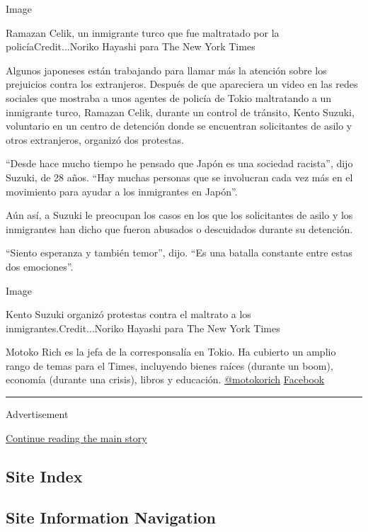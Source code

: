 Image

Ramazan Celik, un inmigrante turco que fue maltratado por la
policíaCredit...Noriko Hayashi para The New York Times

Algunos japoneses están trabajando para llamar más la atención sobre los
prejuicios contra los extranjeros. Después de que apareciera un video en
las redes sociales que mostraba a unos agentes de policía de Tokio
maltratando a un inmigrante turco, Ramazan Celik, durante un control de
tránsito, Kento Suzuki, voluntario en un centro de detención donde se
encuentran solicitantes de asilo y otros extranjeros, organizó dos
protestas.

``Desde hace mucho tiempo he pensado que Japón es una sociedad
racista'', dijo Suzuki, de 28 años. ``Hay muchas personas que se
involucran cada vez más en el movimiento para ayudar a los inmigrantes
en Japón''.

Aún así, a Suzuki le preocupan los casos en los que los solicitantes de
asilo y los inmigrantes han dicho que fueron abusados o descuidados
durante su detención.

``Siento esperanza y también temor'', dijo. ``Es una batalla constante
entre estas dos emociones''.

Image

Kento Suzuki organizó protestas contra el maltrato a los
inmigrantes.Credit...Noriko Hayashi para The New York Times

Motoko Rich es la jefa de la corresponsalía en Tokio. Ha cubierto un
amplio rango de temas para el Times, incluyendo bienes raíces (durante
un boom), economía (durante una crisis), libros y educación.
\href{https://twitter.com/motokorich}{@motokorich} \textbar{}
\href{https://www.facebookcorewwwi.onion/motoko.rich}{Facebook}

\begin{center}\rule{0.5\linewidth}{\linethickness}\end{center}

Advertisement

\protect\hyperlink{after-bottom}{Continue reading the main story}

\hypertarget{site-index}{%
\subsection{Site Index}\label{site-index}}

\hypertarget{site-information-navigation}{%
\subsection{Site Information
Navigation}\label{site-information-navigation}}

